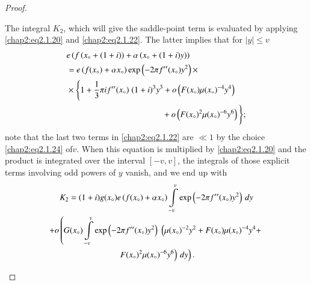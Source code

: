 \begin{proof}
\begin{enumerate}
The integral $K_2$, which will give the saddle-point term is evaluated
by applying \eqref{chap2:eq2.1.20} and \eqref{chap2:eq2.1.22}. The
latter implies that for $|y|\leq v$
\begin{align}
& e\left(f\left(x_\circ+(1+i)\right)+\alpha\left(x_\circ+(1+i)y
\right)\right)\label{chap2:eq2.1.26}\\
& = e\left(f(x_\circ)+\alpha x_\circ\right)\exp\left(-2\pi
f''(x_\circ)y^2\right)\times\notag\\
& \times  \Bigg\{1+\frac{1}{3}\pi i f''(x_\circ)\;(1+i)^3y^3+o\left(
F(x_\circ)\mu(x_\circ)^{-4}y^4\right)\notag\\
&\hspace{4cm} +o\left(F(x_\circ)^2\mu(x_\circ)^{-6}
y^6\right)\Bigg\};\notag
\end{align}
note that the last two terms in \eqref{chap2:eq2.1.22} are $\ll 1$ by
the choice \eqref{chap2:eq2.1.24} of\pageoriginale $v$. When this
equation is multiplied by \eqref{chap2:eq2.1.20} and the product is
integrated over the interval $[-v,v]$, the integrals of those explicit
terms involving odd powers of $y$ vanish, and we end up with 
\begin{gather}
K_2=(1+i)g(x_\circ)e\left(f(x_\circ)+\alpha x_\circ\right)
\int\limits_{-v}^v\exp \left(-2\pi f''(x_\circ)y^2\right)
\,dy\label{chap2:eq2.1.27}\\
+o\left(G(x_\circ)\int\limits_{-v}^v\exp\left(-2\pi
f''(x_\circ)y^2\right)\;\left(\mu(x_\circ)^{-2}y^2+F(x_\circ)\mu
(x_\circ)^{-4}y^4+\right.\right.\notag\\
\left.\left.F(x_\circ)^2\mu(x_\circ)^{-6}y^6\right)\,dy\right).\notag 
\end{gather}


\end{enumerate}
\end{proof}
